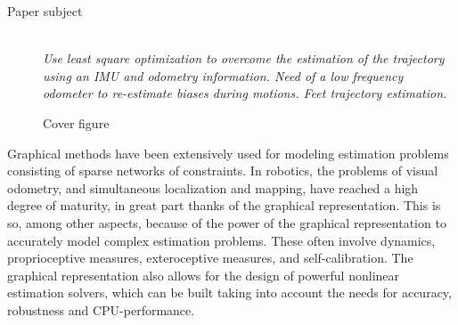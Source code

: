 \begin{description}
 \item [Paper subject] \hfill \\ \textit{Use least square optimization to overcome the estimation of the trajectory using an IMU and odometry information. Need of a low frequency odometer to re-estimate biases during motions. Feet trajectory estimation.}
\end{description}


\begin{figure}
\centering
	\caption{Cover figure}
	\label{fig:cover}
\end{figure}

Graphical methods have been extensively used for modeling estimation problems consisting of sparse networks of constraints. 
In robotics, the problems of visual odometry, and simultaneous localization and mapping, have reached a high degree of maturity, in great part thanks of the graphical representation. 
This is so, among other aspects, because of the power of the graphical representation to accurately model complex estimation problems. 
These often involve dynamics, proprioceptive measures, exteroceptive measures, and self-calibration. 
The graphical representation also allows for the design of powerful nonlinear estimation solvers, which can be built taking into account the needs for accuracy, robustness and CPU-performance.
